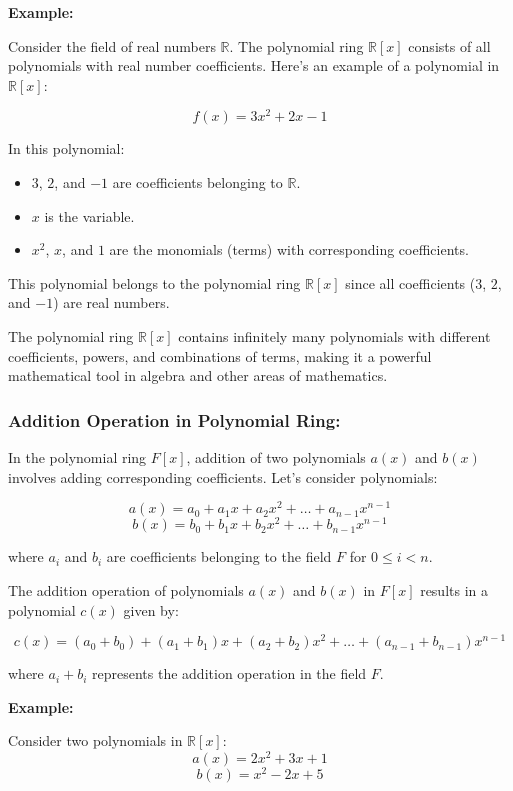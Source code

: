 \documentclass[11pt]{article}
\begin{document}
\textbf{Example:}

Consider the field of real numbers \( \mathbb{R} \). The polynomial ring \( \mathbb{R}[x] \) consists of all polynomials with real number coefficients. Here's an example of a polynomial in \( \mathbb{R}[x] \):

\[ f(x) = 3x^2 + 2x - 1 \]

In this polynomial:
\begin{itemize}
    \item \( 3 \), \( 2 \), and \( -1 \) are coefficients belonging to \( \mathbb{R} \).
    \item \( x \) is the variable.
    \item \( x^2 \), \( x \), and \( 1 \) are the monomials (terms) with corresponding coefficients.
\end{itemize}
This polynomial belongs to the polynomial ring \( \mathbb{R}[x] \) since all coefficients (\( 3 \), \( 2 \), and \( -1 \)) are real numbers.

The polynomial ring \( \mathbb{R}[x] \) contains infinitely many polynomials with different coefficients, powers, and combinations of terms, making it a powerful mathematical tool in algebra and other areas of mathematics.

\subsubsection{Addition Operation in Polynomial Ring:}

In the polynomial ring $F[x]$, addition of two polynomials $a(x)$ and $b(x)$ involves adding corresponding coefficients. Let's consider polynomials:

\[
a(x) = a_0 + a_1x + a_2x^2 + \ldots + a_{n-1}x^{n-1}
\]
\[
b(x) = b_0 + b_1x + b_2x^2 + \ldots + b_{n-1}x^{n-1}
\]

where $a_i$ and $b_i$ are coefficients belonging to the field $F$ for $0 \leq i < n$.

The addition operation of polynomials $a(x)$ and $b(x)$ in $F[x]$ results in a polynomial $c(x)$ given by:

\[
c(x) = (a_0 + b_0) + (a_1 + b_1)x + (a_2 + b_2)x^2 + \ldots + (a_{n-1} + b_{n-1})x^{n-1}
\]

where $a_i + b_i$ represents the addition operation in the field $F$.

\textbf{Example:}

Consider two polynomials in $\mathbb{R}[x]$:
\[
a(x) = 2x^2 + 3x + 1
\]
\[
b(x) = x^2 - 2x + 5
\]
\end{document}
